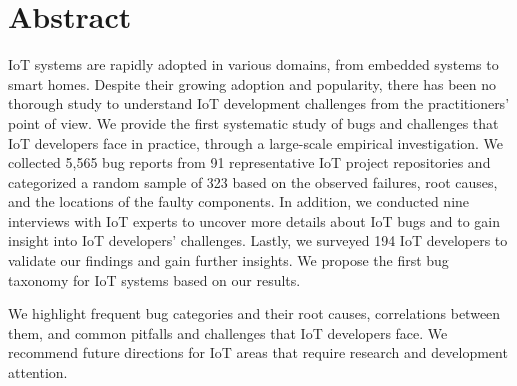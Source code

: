 
\chapter{Abstract}

IoT systems are rapidly adopted in various domains, from embedded systems to smart homes. Despite their growing adoption and popularity, there has been no thorough study to understand IoT development challenges from the practitioners' point of view. We provide the first systematic study of bugs and challenges that IoT developers face in practice, through a large-scale empirical investigation. We collected 5,565 bug reports from 91 representative IoT project repositories and categorized a random sample of 323 based on the observed failures, root causes, and the locations of the faulty components. In addition, we conducted nine interviews with IoT experts to uncover more details about IoT bugs and to gain insight into IoT developers' challenges. Lastly, we surveyed 194 IoT developers to validate our findings and gain further insights. We propose the first bug taxonomy for IoT systems based on our results. 

We highlight frequent bug categories and their root causes, correlations between them, and common pitfalls and challenges that IoT developers face. We recommend future directions for IoT areas that require research and development attention.

